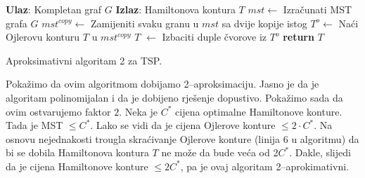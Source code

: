 \documentclass[a4paper, utf8, 11pt, colorlinks]{book}
\begin{document}
\begin{algorithm}[H] 
	\begin{algorithmic}[1]
		\STATE \textbf{Ulaz}: Kompletan graf $G$
		\STATE \textbf{Izlaz}: Hamiltonova kontura $T$   
		\STATE $mst \gets$  Izračunati MST grafa $G$
		\STATE $mst^{copy} \gets$ Zamijeniti svaku granu u $mst$ sa dvije kopije istog
		\STATE $T^o \gets$ Naći Ojlerovu konturu $T$ u $mst^{copy}$
		\STATE   $T$ $\gets$ Izbaciti duple čvorove iz $T^o$   
		\STATE \textbf{return} $T$ 
	\end{algorithmic}
   	\caption{Aproksimativni algoritam 2 za TSP.}
   	\label{alg:tsp-a2}
\end{algorithm}
  Pokažimo da ovim algoritmom dobijamo 2--aproksimaciju. Jasno je da je algoritam polinomijalan i da je dobijeno rješenje dopustivo. Pokažimo sada da ovim ostvarujemo faktor $2$.  
  Neka je $C^*$ cijena optimalne Hamiltonove konture. Tada je MST $\leq C^*$. 
  Lako se vidi da je cijena Ojlerove konture  $\leq 2 \cdot C^*$. Na osnovu nejednakosti trougla skraćivanje Ojlerove konture (linija 6 u algoritmu) da bi se dobila Hamiltonova kontura $T$ ne može da bude veća od 2$C^*$. Dakle, slijedi da je cijena Hamiltonove konture $\leq 2 C^*$, pa je ovaj algoritam 2--aprokimativni.
  
\end{document}
